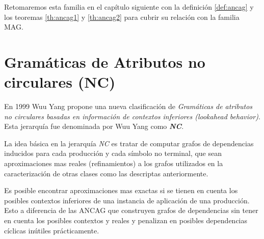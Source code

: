 Retomaremos esta familia en el capítulo siguiente con la definición \ref{def:ancag} y los teoremas \ref{th:ancag1} y \ref{th:ancag2} para cubrir su relación con la familia MAG.

\section{Gramáticas de Atributos no circulares (NC)}

En 1999 Wuu Yang\cite{wuu-yang2} propone una nueva clasificación de \emph{Gramáticas de atributos no circulares basadas en información de contextos inferiores (lookahead behavior)}. Esta jerarquía fue denominada por Wuu Yang como  \emph{\textbf{NC}}.

La idea básica en la jerarquía \emph{NC} es tratar de computar grafos de dependencias inducidos para cada producción y cada símbolo no terminal, que sean aproximaciones mas reales (refinamientos) a los grafos utilizados en la caracterización de otras clases como las descriptas anteriormente. 

Es posible encontrar aproximaciones mas exactas si se tienen en cuenta los posibles contextos inferiores de una instancia de aplicación de una producción. Esto a diferencia de las ANCAG que construyen grafos de dependencias sin tener en cuenta los posibles contextos y reales y penalizan en posibles dependencias cíclicas inútiles prácticamente. 

